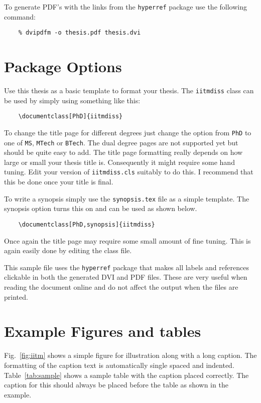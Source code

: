 	To generate PDF's with the links from the \verb+hyperref+ package use
	the following command:
	\begin{verbatim}
	% dvipdfm -o thesis.pdf thesis.dvi
	\end{verbatim}
	
	\section{Package Options}
	
	Use this thesis as a basic template to format your thesis.  The
	\verb+iitmdiss+ class can be used by simply using something like this:
	\begin{verbatim}
	\documentclass[PhD]{iitmdiss}  
	\end{verbatim}
	
	To change the title page for different degrees just change the option
	from \verb+PhD+ to one of \verb+MS+, \verb+MTech+ or \verb+BTech+.
	The dual degree pages are not supported yet but should be quite easy
	to add.  The title page formatting really depends on how large or
	small your thesis title is.  Consequently it might require some hand
	tuning.  Edit your version of \verb+iitmdiss.cls+ suitably to do this.
	I recommend that this be done once your title is final.
	
	To write a synopsis simply use the \verb+synopsis.tex+ file as a
	simple template.  The synopsis option turns this on and can be used as
	shown below.
	\begin{verbatim}
	\documentclass[PhD,synopsis]{iitmdiss}                                
	\end{verbatim}
	
	Once again the title page may require some small amount of fine
	tuning.  This is again easily done by editing the class file.
	
	This sample file uses the \verb+hyperref+ package that makes all
	labels and references clickable in both the generated DVI and PDF
	files.  These are very useful when reading the document online and do
	not affect the output when the files are printed.
	
	
	\section{Example Figures and tables}
	
	Fig.~\ref{fig:iitm} shows a simple figure for illustration along with
	a long caption.  The formatting of the caption text is automatically
	single spaced and indented.  Table~\ref{tab:sample} shows a sample
	table with the caption placed correctly.  The caption for this should
	always be placed before the table as shown in the example.
	
